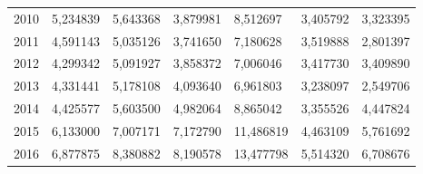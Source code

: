 \begin{table}
\begin{tabular}{p{1cm}p{2cm}p{2cm}p{2cm}p{2cm}p{2cm}p{2cm}}
 2010 &                                    5,234839 &                            5,643368 &             3,879981 &                    8,512697 &                        3,405792 & 3,323395 \\
 2011 &                                    4,591143 &                            5,035126 &             3,741650 &                    7,180628 &                        3,519888 & 2,801397 \\
 2012 &                                    4,299342 &                            5,091927 &             3,858372 &                    7,006046 &                        3,417730 & 3,409890 \\
 2013 &                                    4,331441 &                            5,178108 &             4,093640 &                    6,961803 &                        3,238097 & 2,549706 \\
 2014 &                                    4,425577 &                            5,603500 &             4,982064 &                    8,865042 &                        3,355526 & 4,447824 \\
 2015 &                                    6,133000 &                            7,007171 &             7,172790 &                   11,486819 &                        4,463109 & 5,761692 \\
 2016 &                                    6,877875 &                            8,380882 &             8,190578 &                   13,477798 &                        5,514320 & 6,708676 \\
\bottomrule
\end{tabular}
\end{table}
